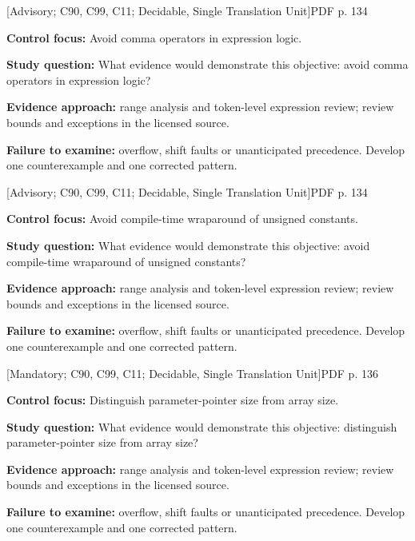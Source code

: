 \documentclass[10pt,letterpaper]{article}
\begin{document}
\smallskip
{}
 \textsf{\footnotesize [Advisory; C90, C99, C11; Decidable, Single Translation Unit]}\hfill{\footnotesize PDF p. 134}\par
\textbf{Control focus:} Avoid comma operators in expression logic.\par
\textbf{Study question:} What evidence would demonstrate this objective: avoid comma operators in expression logic?\par
\textbf{Evidence approach:} range analysis and token-level expression review; review bounds and exceptions in the licensed source.\par
\textbf{Failure to examine:} overflow, shift faults or unanticipated precedence. Develop one counterexample and one corrected pattern.\par
\smallskip
{}
 \textsf{\footnotesize [Advisory; C90, C99, C11; Decidable, Single Translation Unit]}\hfill{\footnotesize PDF p. 134}\par
\textbf{Control focus:} Avoid compile-time wraparound of unsigned constants.\par
\textbf{Study question:} What evidence would demonstrate this objective: avoid compile-time wraparound of unsigned constants?\par
\textbf{Evidence approach:} range analysis and token-level expression review; review bounds and exceptions in the licensed source.\par
\textbf{Failure to examine:} overflow, shift faults or unanticipated precedence. Develop one counterexample and one corrected pattern.\par
\smallskip
{}
 \textsf{\footnotesize [Mandatory; C90, C99, C11; Decidable, Single Translation Unit]}\hfill{\footnotesize PDF p. 136}\par
\textbf{Control focus:} Distinguish parameter-pointer size from array size.\par
\textbf{Study question:} What evidence would demonstrate this objective: distinguish parameter-pointer size from array size?\par
\textbf{Evidence approach:} range analysis and token-level expression review; review bounds and exceptions in the licensed source.\par
\textbf{Failure to examine:} overflow, shift faults or unanticipated precedence. Develop one counterexample and one corrected pattern.\par
\end{document}
